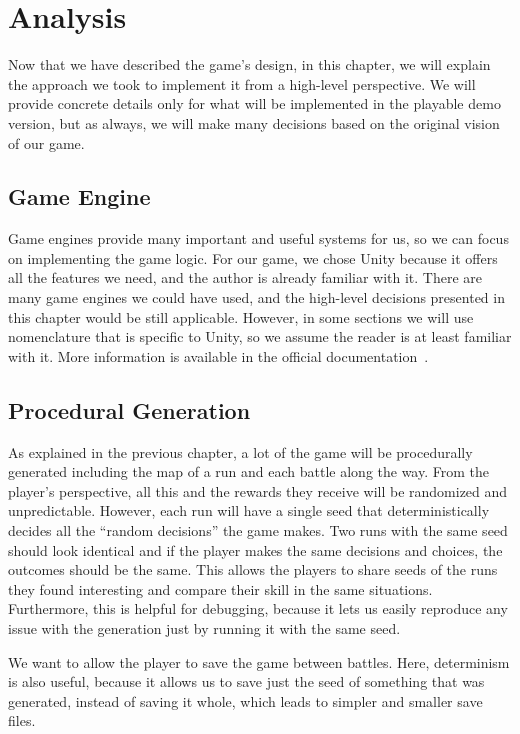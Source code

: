 \chapter{Analysis}

Now that we have described the game's design, in this chapter, we will explain the approach we took to implement it from a high-level perspective.
We will provide concrete details only for what will be implemented in the playable demo version, but as always, we will make many decisions based on the original vision of our game.

\section{Game Engine}

Game engines provide many important and useful systems for us, so we can focus on implementing the game logic.
For our game, we chose Unity because it offers all the features we need, and the author is already familiar with it.
There are many game engines we could have used, and the high-level decisions presented in this chapter would be still applicable.
However, in some sections we will use nomenclature that is specific to Unity, so we assume the reader is at least familiar with it.
More information is available in the official documentation~\cite{UnityDocs}.

\section{Procedural Generation}

As explained in the previous chapter, a lot of the game will be procedurally generated including the map of a run and each battle along the way.
From the player's perspective, all this and the rewards they receive will be randomized and unpredictable.
However, each run will have a single seed that deterministically decides all the \enquote{random decisions} the game makes.
Two runs with the same seed should look identical and if the player makes the same decisions and choices, the outcomes should be the same.
This allows the players to share seeds of the runs they found interesting and compare their skill in the same situations.
Furthermore, this is helpful for debugging, because it lets us easily reproduce any issue with the generation just by running it with the same seed.

We want to allow the player to save the game between battles.
Here, determinism is also useful, because it allows us to save just the seed of something that was generated, instead of saving it whole, which leads to simpler and smaller save files.


